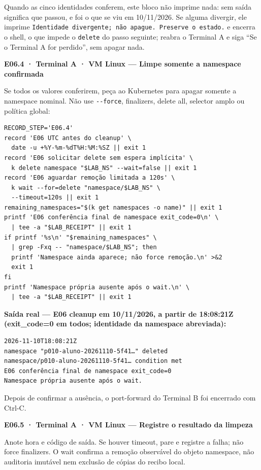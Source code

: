 \documentclass[12pt,openany,oneside,a4paper,chapter=TITLE,english,brazil]{abntex2}
\begin{document}
Quando as cinco identidades conferem, este bloco não imprime nada: sem saída significa que passou, e foi o que se viu em 10/11/2026. Se alguma divergir, ele imprime \texttt{Identidade divergente; não apague.\allowbreak{} Preserve o estado.\allowbreak{}} e encerra o shell, o que impede o \texttt{delete} do passo seguinte; reabra o Terminal A e siga ``Se o Terminal A for perdido'', sem apagar nada.

\textbf{E06.4 · Terminal A · VM Linux --- Limpe somente a namespace confirmada}

Se todos os valores conferirem, peça ao Kubernetes para apagar somente a namespace nominal. Não use \texttt{-{}\allowbreak{}-{}\allowbreak{}force}, finalizers, delete all, selector amplo ou política global:

\begin{verbatim}
RECORD_STEP='E06.4'
record 'E06 UTC antes do cleanup' \
  date -u +%Y-%m-%dT%H:%M:%SZ || exit 1
record 'E06 solicitar delete sem espera implícita' \
  k delete namespace "$LAB_NS" --wait=false || exit 1
record 'E06 aguardar remoção limitada a 120s' \
  k wait --for=delete "namespace/$LAB_NS" \
  --timeout=120s || exit 1
remaining_namespaces="$(k get namespaces -o name)" || exit 1
printf 'E06 conferência final de namespace exit_code=0\n' \
  | tee -a "$LAB_RECEIPT" || exit 1
if printf '%s\n' "$remaining_namespaces" \
  | grep -Fxq -- "namespace/$LAB_NS"; then
  printf 'Namespace ainda aparece; não force remoção.\n' >&2
  exit 1
fi
printf 'Namespace própria ausente após o wait.\n' \
  | tee -a "$LAB_RECEIPT" || exit 1
\end{verbatim}

\textbf{Saída real --- E06 cleanup em 10/11/2026, a partir de 18:08:21Z (exit\_code=0 em todos; identidade da namespace abreviada):}

\begin{verbatim}
2026-11-10T18:08:21Z
namespace "p010-aluno-20261110-5f41…" deleted
namespace/p010-aluno-20261110-5f41… condition met
E06 conferência final de namespace exit_code=0
Namespace própria ausente após o wait.
\end{verbatim}

Depois de confirmar a ausência, o port-forward do Terminal B foi encerrado com Ctrl-C.

\textbf{E06.5 · Terminal A · VM Linux --- Registre o resultado da limpeza}

Anote hora e código de saída. Se houver timeout, pare e registre a falha; não force finalizers. O wait confirma a remoção observável do objeto namespace, não auditoria imutável nem exclusão de cópias do recibo local.
\end{document}
